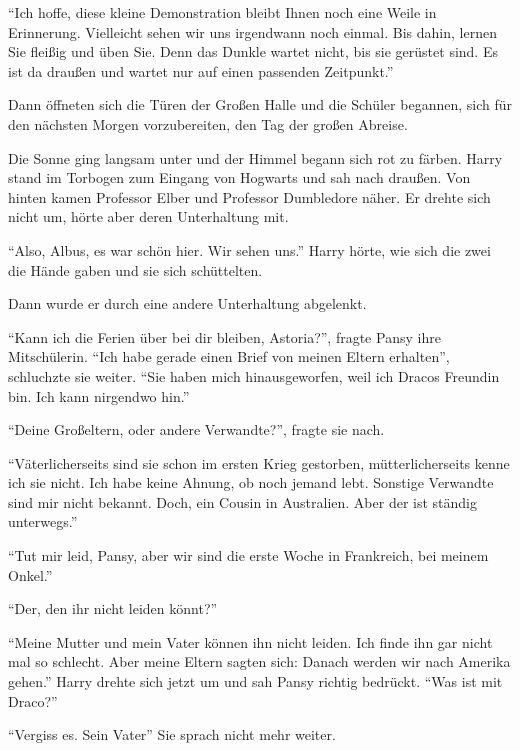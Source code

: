 \enquote{Ich hoffe, diese kleine Demonstration bleibt Ihnen noch eine Weile in Erinnerung. Vielleicht sehen wir uns irgendwann noch einmal. Bis dahin, lernen Sie fleißig und üben Sie. Denn das Dunkle wartet nicht, bis sie gerüstet sind. Es ist da draußen und wartet nur auf einen passenden Zeitpunkt.}

Dann öffneten sich die Türen der Großen Halle und die Schüler begannen, sich für den nächsten Morgen vorzubereiten, den Tag der großen Abreise.

Die Sonne ging langsam unter und der Himmel begann sich rot zu färben. Harry stand im Torbogen zum Eingang von Hogwarts und sah nach draußen. Von hinten kamen Professor Elber und Professor Dumbledore näher. Er drehte sich nicht um, hörte aber deren Unterhaltung mit.

\enquote{Also, Albus, es war schön hier. Wir sehen uns.} Harry hörte, wie sich die zwei die Hände gaben und sie sich schüttelten.

Dann wurde er durch eine andere Unterhaltung abgelenkt.

\enquote{Kann ich die Ferien über bei dir bleiben, Astoria?}, fragte Pansy ihre Mitschülerin. \enquote{Ich habe gerade einen Brief von meinen Eltern erhalten}, schluchzte sie weiter. \enquote{Sie haben mich hinausgeworfen, weil ich Dracos Freundin bin. Ich kann nirgendwo hin.}

\enquote{Deine Großeltern, oder andere Verwandte?}, fragte sie nach.

\enquote{Väterlicherseits sind sie schon im ersten Krieg gestorben, mütterlicherseits kenne ich sie nicht. Ich habe keine Ahnung, ob noch jemand lebt. Sonstige Verwandte sind mir nicht bekannt. \gst Doch, ein Cousin in Australien. Aber der ist ständig unterwegs.}

\enquote{Tut mir leid, Pansy, aber wir sind die erste Woche in Frankreich, bei meinem Onkel.}

\enquote{Der, den ihr nicht leiden könnt?}

\enquote{Meine Mutter und mein Vater können ihn nicht leiden. Ich finde ihn gar nicht mal so schlecht. Aber meine Eltern sagten sich:  Danach werden wir nach Amerika gehen.} Harry drehte sich jetzt um und sah Pansy richtig bedrückt. \enquote{Was ist mit Draco?}

\enquote{Vergiss es. Sein Vater\abs} Sie sprach nicht mehr weiter.

